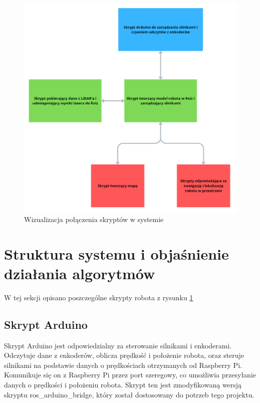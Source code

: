 \documentclass[a4paper,twoside,12pt]{book}
\begin{document}
\begin{figure}[!hb]
	\centering
	\includegraphics[width=1\textwidth]{images/diagram-programy.png}
	\caption{Wizualizacja połączenia skryptów w systemie}
	\label{fig:diagram-programy}
\end{figure}


\newpage
\section{Struktura systemu i objaśnienie działania algorytmów}
W tej sekcji opisano poszczególne skrypty robota z rysunku \ref{fig:diagram-programy}

\subsection{Skrypt Arduino}
Skrypt Arduino jest odpowiedzialny za sterowanie silnikami i enkoderami. Odczytuje dane z enkoderów, oblicza prędkość i położenie robota, oraz steruje silnikami na podstawie danych o prędkościach otrzymanych od Raspberry Pi. Komunikuje się on z Raspberry Pi przez port szeregowy, co umożliwia przesyłanie danych o prędkości i położeniu robota.
Skrypt ten jest zmodyfikowaną wersją skryptu ros\_arduino\_bridge\cite{bib:rosarduinobridge}, który został dostosowany do potrzeb tego projektu.
\end{document}
